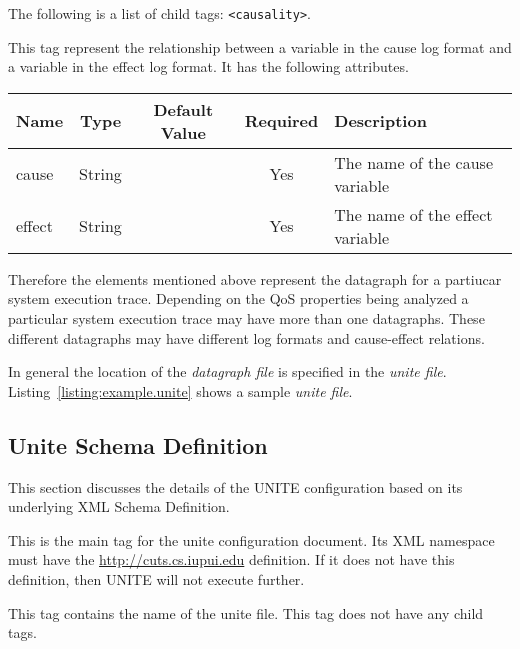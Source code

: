\noindent The following is a list of child tags:
\texttt{<causality>}.


This tag represent the relationship between a variable in the 
cause log format and a variable in the effect log format. It has 
the following attributes.
\begin{table}[h]
  \begin{tabular}{lcccl}
  \hline
  \textbf{Name} & \textbf{Type} & \textbf{Default Value} & \textbf{Required} & \textbf{Description} \\
  \hline
  cause & String  & & Yes & The name of the cause variable \\
  effect  & String  & & Yes &  The name of the effect variable \\   
  \end{tabular}
\end{table}

Therefore the elements mentioned above represent the datagraph 
for a partiucar system execution trace. Depending on the QoS 
properties being analyzed a particular system execution trace 
may have more than one datagraphs. These different datagraphs 
may have different log formats and cause-effect relations.

In general the location of the \textit{datagraph file} is specified in the 
\textit{unite file}. Listing~\ref{listing:example.unite} shows a sample 
\textit{unite file}. 



\subsection{Unite Schema Definition}
\label{sec:unite-scema}

This section discusses the details of the UNITE configuration 
based on its underlying XML Schema Definition.

This is the main tag for the unite configuration document. Its 
XML namespace must have the \url{http://cuts.cs.iupui.edu} definition. If it does
not have this definition, then UNITE will not execute further.


This tag contains the name of the unite file. This tag does not have 
any child tags.


